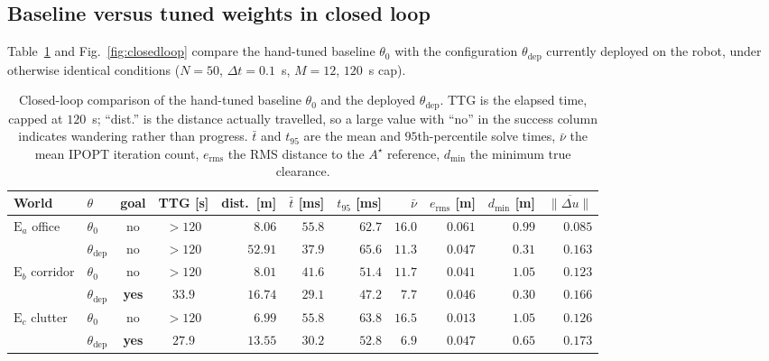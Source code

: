 \documentclass[11pt,a4paper]{article}
\newcommand{\astar}{$A^\star$}
\newcommand{\thn}{\theta_0}
\newcommand{\thst}{\theta_{\mathrm{dep}}}
\begin{document}
\subsection{Baseline versus tuned weights in closed loop}
\label{sec:closedloop}

Table~\ref{tab:closedloop} and Fig.~\ref{fig:closedloop} compare the hand-tuned baseline $\thn$ with the
configuration $\thst$ currently deployed on the robot, under otherwise identical conditions ($N=50$, $\Delta t=0.1$~s, $M=12$, $120$~s
cap).

\begin{table}[htbp]
  \centering
  \small
  \caption{Closed-loop comparison of the hand-tuned baseline $\thn$ and the deployed $\thst$. TTG is the
  elapsed time, capped at $120$~s; ``dist.'' is the distance actually travelled, so a large value with
  ``no'' in the success column indicates wandering rather than progress. $\bar t$ and $t_{95}$ are the mean
  and $95$th-percentile solve times, $\bar\nu$ the mean IPOPT iteration count, $e_{\mathrm{rms}}$ the RMS
  distance to the \astar{} reference, $d_{\min}$ the minimum true clearance.}
  \label{tab:closedloop}
  \begin{tabular}{llccrrrrrrr}
    \toprule
    World & $\theta$ & goal & TTG [s] & dist.\ [m] & $\bar t$ [ms] & $t_{95}$ [ms] & $\bar\nu$ &
    $e_{\mathrm{rms}}$ [m] & $d_{\min}$ [m] & $\overline{\|\Delta u\|}$ \\
    \midrule
    \multirow{2}{*}{$\mathrm{E}_a$ office}
      & $\thn$  & no  & $>120$ & $8.06$  & $55.8$ & $62.7$ & $16.0$ & $0.061$ & $0.99$ & $0.085$ \\
      & $\thst$ & no  & $>120$ & $52.91$ & $37.9$ & $65.6$ & $11.3$ & $0.047$ & $0.31$ & $0.163$ \\
    \midrule
    \multirow{2}{*}{$\mathrm{E}_b$ corridor}
      & $\thn$  & no  & $>120$ & $8.01$  & $41.6$ & $51.4$ & $11.7$ & $0.041$ & $1.05$ & $0.123$ \\
      & $\thst$ & \textbf{yes} & $\mathbf{33.9}$ & $16.74$ & $29.1$ & $47.2$ & $7.7$ & $0.046$ & $0.30$ & $0.166$ \\
    \midrule
    \multirow{2}{*}{$\mathrm{E}_c$ clutter}
      & $\thn$  & no  & $>120$ & $6.99$  & $55.8$ & $63.8$ & $16.5$ & $0.013$ & $1.05$ & $0.126$ \\
      & $\thst$ & \textbf{yes} & $\mathbf{27.9}$ & $13.55$ & $30.2$ & $52.8$ & $6.9$ & $0.047$ & $0.65$ & $0.173$ \\
    \bottomrule
  \end{tabular}
\end{table}
\end{document}
